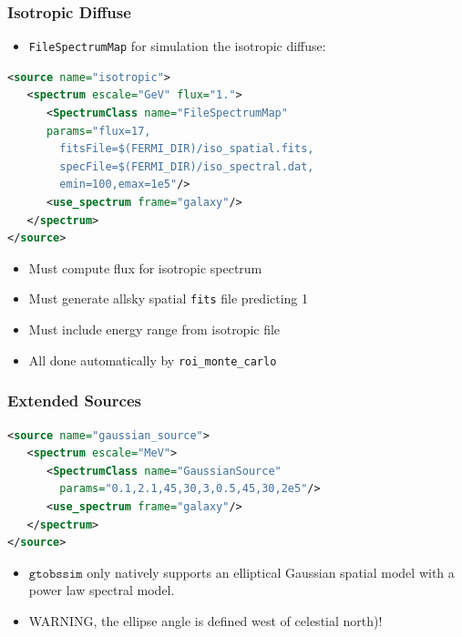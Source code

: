 \documentclass[12pt]{beamer}
\newcommand{\gtobssim}{\ensuremath{\mathtt{gtobssim}}\xspace}
\newcommand{\roimc}{\texttt{roi\_monte\_carlo}\xspace}
\newcommand{\FileSpectrumMap}{\texttt{FileSpectrumMap}\xspace}
\begin{document}
\begin{frame}[fragile]
  \frametitle{Isotropic Diffuse}
\begin{itemize}
\item \FileSpectrumMap for simulation the isotropic diffuse:
\end{itemize}

\begin{lstlisting}[language=XML]
<source name="isotropic">
   <spectrum escale="GeV" flux="1.">
      <SpectrumClass name="FileSpectrumMap" 
      params="flux=17,
        fitsFile=$(FERMI_DIR)/iso_spatial.fits,
        specFile=$(FERMI_DIR)/iso_spectral.dat,
        emin=100,emax=1e5"/>
      <use_spectrum frame="galaxy"/>
   </spectrum>
</source>
\end{lstlisting}

\begin{itemize}
  \item Must compute flux for isotropic spectrum
  \item Must generate allsky spatial \texttt{fits} file predicting 1 
  \item Must include energy range from isotropic file
  \item All done automatically by \roimc
\end{itemize}
\end{frame}

\begin{frame}[fragile]
\frametitle{Extended Sources}
\begin{lstlisting}[language=XML]
<source name="gaussian_source">
   <spectrum escale="MeV">
      <SpectrumClass name="GaussianSource" 
        params="0.1,2.1,45,30,3,0.5,45,30,2e5"/>
      <use_spectrum frame="galaxy"/>
   </spectrum>
</source>
\end{lstlisting}
  \begin{itemize}
    \item \gtobssim only natively supports an elliptical Gaussian spatial model with a power law spectral model.
    \item WARNING, the ellipse angle is defined west of celestial north)!
  \end{itemize}
\end{frame}
\end{document}
